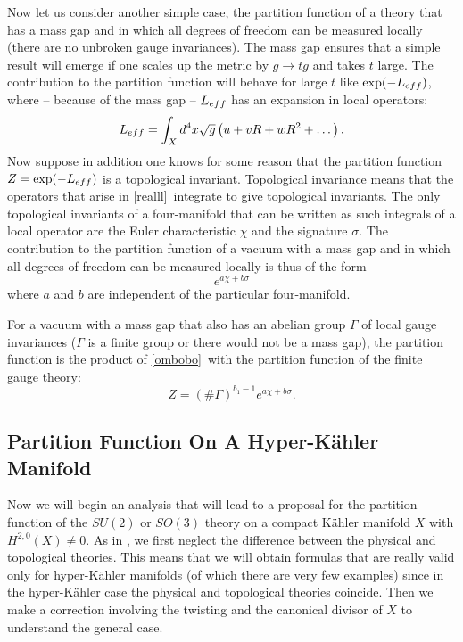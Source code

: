 \documentclass[12pt]{article}
\numberwithin{equation}{section}
\begin{document}
Now let us consider another simple case, the partition function
of a theory that has a mass gap and in which all degrees of freedom
can be measured locally (there are no unbroken gauge invariances).
The mass gap ensures that a simple result will emerge if one scales
up the metric by $g\to tg$ and takes $t$ large.
The contribution to the partition
function will behave for large $t$ like $\exp(-L_{\mit eff})$,
where -- because of the mass gap -- $L_{\mit eff}$ has an expansion
in local operators:
\begin{equation}
  \label{realll}
  L_{\mit eff}=\int_X d^4x\sqrt g\left(u + v R + w R^2+\dots\right).
\end{equation}
Now suppose in addition one knows for some reason that the partition
function $Z=\exp(-L_{\mit eff})$ is a topological invariant.
Topological invariance means that the operators that arise in \eqref{realll}\
integrate to give topological invariants.  The only
topological invariants of a four-manifold that can be written as such
integrals of a local operator are the Euler characteristic $\chi$
and the signature $\sigma$.  The contribution
to the partition function of a vacuum with a mass gap and in which
all degrees of freedom can be measured locally is thus of the form
\begin{equation}
  \label{ombobo}
  e^{a\chi + b\sigma}
\end{equation}
where $a$ and $b$ are independent of the particular four-manifold.

For a vacuum with a mass gap that also has an abelian  group $\Gamma$
of local gauge invariances ($\Gamma$ is a finite group or there would
not be a mass gap), the partition function is the product of \eqref{ombobo}\
with the partition function of the finite gauge theory:
\begin{equation}
  \label{mombobo}
  Z=(\#\Gamma)^{b_1-1}e^{a\chi+b\sigma}.
\end{equation}

\subsection{Partition Function On A Hyper-K\"ahler Manifold}

Now we will begin an analysis that will lead to a proposal
for the partition function of the $SU(2)$ or $SO(3)$ theory on
a compact K\"ahler manifold $X$ with $H^{2,0}(X)\not= 0$.
As in \cite{switten}, we first neglect
the difference between the physical and topological theories.
This means that we will obtain formulas that are really valid only
for hyper-K\"ahler manifolds (of which there are very few examples)
since in the hyper-K\"ahler case the physical and topological theories
coincide.  Then we make a correction involving the twisting and the
canonical divisor of $X$ to understand the general case.
\end{document}
